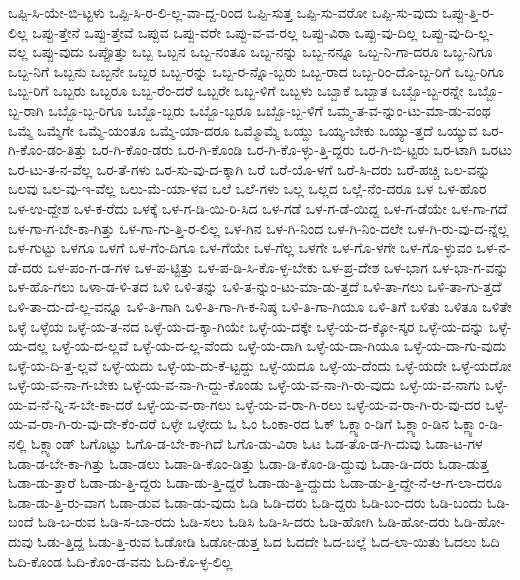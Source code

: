 {ಒಪ್ಪಿ-ಸಿ-ಯೇ-ಬಿ-ಟ್ಟಳು
ಒಪ್ಪಿ-ಸಿ-ರ-ಲಿ-ಲ್ಲ-ವಾ-ದ್ದ-ರಿಂದ
ಒಪ್ಪಿ-ಸುತ್ತ
ಒಪ್ಪಿ-ಸು-ವರೋ
ಒಪ್ಪಿ-ಸು-ವುದು
ಒಪ್ಪು-ತ್ತಿ-ರ-ಲಿಲ್ಲ
ಒಪ್ಪು-ತ್ತೇನೆ
ಒಪ್ಪು-ತ್ತೇವೆ
ಒಪ್ಪುವ
ಒಪ್ಪು-ವರೇ
ಒಪ್ಪು-ವ-ವ-ರಲ್ಲ
ಒಪ್ಪು-ವಿರಾ
ಒಪ್ಪು-ವು-ದಿಲ್ಲ
ಒಪ್ಪು-ವು-ದಿ-ಲ್ಲ-ವಲ್ಲ
ಒಪ್ಪು-ವುದು
ಒಪ್ಪೊತ್ತು
ಒಬ್ಬ
ಒಬ್ಬನ
ಒಬ್ಬ-ನಂತೂ
ಒಬ್ಬ-ನನ್ನು
ಒಬ್ಬ-ನನ್ನೂ
ಒಬ್ಬ-ನಿ-ಗಾ-ದರೂ
ಒಬ್ಬ-ನಿಗೂ
ಒಬ್ಬ-ನಿಗೆ
ಒಬ್ಬನು
ಒಬ್ಬನೇ
ಒಬ್ಬರ
ಒಬ್ಬ-ರನ್ನು
ಒಬ್ಬ-ರ-ನ್ನೊ-ಬ್ಬರು
ಒಬ್ಬ-ರಾದ
ಒಬ್ಬ-ರಿಂ-ದೊ-ಬ್ಬ-ರಿಗೆ
ಒಬ್ಬ-ರಿಗೂ
ಒಬ್ಬ-ರಿಗೆ
ಒಬ್ಬರು
ಒಬ್ಬರೂ
ಒಬ್ಬ-ರೆಂ-ದರೆ
ಒಬ್ಬರೇ
ಒಬ್ಬ-ಳಿಗೆ
ಒಬ್ಬಳು
ಒಬ್ಬಾಕೆ
ಒಬ್ಬಾತ
ಒಬ್ಬೊ-ಬ್ಬ-ರನ್ನೇ
ಒಬ್ಬೊ-ಬ್ಬ-ರಾಗಿ
ಒಬ್ಬೊ-ಬ್ಬ-ರಿಗೂ
ಒಬ್ಬೊ-ಬ್ಬರು
ಒಬ್ಬೊ-ಬ್ಬರೂ
ಒಬ್ಬೊ-ಬ್ಬ-ಳಿಗೆ
ಒಮ್ಮ-ತ-ವ-ನ್ನುಂ-ಟು-ಮಾ-ಡು-ವಂಥ
ಒಮ್ಮೆ
ಒಮ್ಮೆಗೇ
ಒಮ್ಮೆ-ಯಂತೂ
ಒಮ್ಮೆ-ಯಾ-ದರೂ
ಒಮ್ಮೊಮ್ಮೆ
ಒಯ್ದು
ಒಯ್ಯ-ಬೇಕು
ಒಯ್ಯು-ತ್ತದೆ
ಒಯ್ಯುವ
ಒರ-ಗಿ-ಕೊಂ-ಡಂ-ತಿತ್ತು
ಒರ-ಗಿ-ಕೊಂ-ಡರು
ಒರ-ಗಿ-ಕೊಂಡಿ
ಒರ-ಗಿ-ಕೊ-ಳ್ಳು-ತ್ತಿ-ದ್ದರು
ಒರ-ಗಿ-ಬಿ-ಟ್ಟರು
ಒರ-ಟಾಗಿ
ಒರಟು
ಒರ-ಟು-ತ-ನ-ವೆಲ್ಲ
ಒರ-ತೆ-ಗಳು
ಒರ-ಸು-ವು-ದ-ಕ್ಕಾಗಿ
ಒರೆ
ಒರೆ-ಯೊ-ಳಗೆ
ಒರೆ-ಸಿ-ದರು
ಒರೆ-ಹಚ್ಚಿ
ಒಲ-ವನ್ನು
ಒಲವು
ಒಲ-ವು-ಇ-ವೆಲ್ಲ
ಒಲು-ಮೆ-ಯಾ-ಳವ
ಒಲೆ
ಒಲೆ-ಗಳು
ಒಲ್ಲ
ಒಲ್ಲದ
ಒಲ್ಲೆ-ನೆಂ-ದರೂ
ಒಳ
ಒಳ-ಹೊರ
ಒಳ-ಉ-ದ್ದೇಶ
ಒಳ-ಕ-ರೆದು
ಒಳಕ್ಕೆ
ಒಳ-ಗ-ಡಿ-ಯಿ-ರಿ-ಸಿದ
ಒಳ-ಗಡೆ
ಒಳ-ಗ-ಡೆ-ಯಿದ್ದ
ಒಳ-ಗ-ಡೆಯೇ
ಒಳ-ಗಾ-ಗದೆ
ಒಳ-ಗಾ-ಗ-ಬೇ-ಕಾ-ಗಿತ್ತು
ಒಳ-ಗಾ-ಗು-ತ್ತಿ-ರ-ಲಿಲ್ಲ
ಒಳ-ಗಿನ
ಒಳ-ಗಿ-ನಿಂದ
ಒಳ-ಗಿ-ನಿಂ-ದಲೇ
ಒಳ-ಗಿ-ರು-ವು-ದ-ನ್ನೆಲ್ಲ
ಒಳ-ಗುಟ್ಟು
ಒಳಗೂ
ಒಳಗೆ
ಒಳ-ಗೆಂ-ದಿಗೂ
ಒಳ-ಗೆಯೇ
ಒಳ-ಗೆಲ್ಲ
ಒಳಗೇ
ಒಳ-ಗೊ-ಳಗೇ
ಒಳ-ಗೊ-ಳ್ಳುವಂ
ಒಳ-ನ-ಡೆ-ದರು
ಒಳ-ಪಂ-ಗ-ಡ-ಗಳ
ಒಳ-ಪ-ಟ್ಟಿತ್ತು
ಒಳ-ಪ-ಡಿ-ಸಿ-ಕೊ-ಳ್ಳ-ಬೇಕು
ಒಳ-ಪ್ರ-ದೇಶ
ಒಳ-ಭಾಗ
ಒಳ-ಭಾ-ಗ-ವನ್ನು
ಒಳ-ಹೊ-ಗಲು
ಒಳಾ-ಡ-ಳಿ-ತದ
ಒಳಿ
ಒಳಿ-ತನ್ನು
ಒಳಿ-ತ-ನ್ನುಂ-ಟು-ಮಾ-ಡು-ತ್ತದೆ
ಒಳಿ-ತಾ-ಗಲು
ಒಳಿ-ತಾ-ಗು-ತ್ತದೆ
ಒಳಿ-ತಾ-ದು-ದೆ-ಲ್ಲ-ವನ್ನೂ
ಒಳಿ-ತಿ-ಗಾಗಿ
ಒಳಿ-ತಿ-ಗಾ-ಗಿ-ಕ-ನಿಷ್ಠ
ಒಳಿ-ತಿ-ಗಾ-ಗಿಯೂ
ಒಳಿ-ತಿಗೆ
ಒಳಿತು
ಒಳಿತೂ
ಒಳಿತೇ
ಒಳ್ಳೆ
ಒಳ್ಳೆಯ
ಒಳ್ಳೆ-ಯ-ತ-ನದ
ಒಳ್ಳೆ-ಯ-ದ-ಕ್ಕಾ-ಗಿಯೇ
ಒಳ್ಳೆ-ಯ-ದಕ್ಕೇ
ಒಳ್ಳೆ-ಯ-ದ-ಕ್ಕೋ-ಸ್ಕರ
ಒಳ್ಳೆ-ಯ-ದನ್ನು
ಒಳ್ಳೆ-ಯ-ದಲ್ಲ
ಒಳ್ಳೆ-ಯ-ದ-ಲ್ಲವೆ
ಒಳ್ಳೆ-ಯ-ದ-ಲ್ಲ-ವೆಂದು
ಒಳ್ಳೆ-ಯ-ದಾಗಿ
ಒಳ್ಳೆ-ಯ-ದಾ-ಗಿಯೂ
ಒಳ್ಳೆ-ಯ-ದಾ-ಗು-ವುದು
ಒಳ್ಳೆ-ಯ-ದಿ-ತ್ತ-ಲ್ಲವೆ
ಒಳ್ಳೆ-ಯದು
ಒಳ್ಳೆ-ಯ-ದು-ಕೆ-ಟ್ಟದ್ದು
ಒಳ್ಳೆ-ಯದೂ
ಒಳ್ಳೆ-ಯ-ದೆಂದು
ಒಳ್ಳೆ-ಯದೇ
ಒಳ್ಳೆ-ಯದೋ
ಒಳ್ಳೆ-ಯ-ವ-ನಾ-ಗ-ಬೇಕು
ಒಳ್ಳೆ-ಯ-ವ-ನಾ-ಗಿ-ದ್ದು-ಕೊಂಡು
ಒಳ್ಳೆ-ಯ-ವ-ನಾ-ಗಿ-ರು-ವುದು
ಒಳ್ಳೆ-ಯ-ವ-ನಾಗು
ಒಳ್ಳೆ-ಯ-ವ-ನೆ-ನ್ನಿ-ಸ-ಬೇ-ಕಾ-ದರೆ
ಒಳ್ಳೆ-ಯ-ವ-ರಾ-ಗಲು
ಒಳ್ಳೆ-ಯ-ವ-ರಾ-ಗಿ-ರಲು
ಒಳ್ಳೆ-ಯ-ವ-ರಾ-ಗಿ-ರು-ವು-ದರ
ಒಳ್ಳೆ-ಯ-ವ-ರಾ-ಗಿ-ರು-ವು-ದೇ-ಕೆಂ-ದರೆ
ಒಳ್ಳೇ
ಒಳ್ಳೇದು
ಓ
ಓಂ
ಓಂಕಾ-ರದ
ಓಕ್
ಓಕ್ಲ್ಯಾಂ-ಡಿಗೆ
ಓಕ್ಲ್ಯಾಂ-ಡಿನ
ಓಕ್ಲ್ಯಾಂ-ಡಿ-ನಲ್ಲಿ
ಓಕ್ಲ್ಯಾಂಡ್
ಓಗೊಟ್ಟು
ಓಗೊ-ಡ-ಬೇ-ಕಾ-ಗಿದೆ
ಓಗೊ-ಡು-ವಿರಾ
ಓಟ
ಓಡ-ತೊ-ಡ-ಗಿ-ದುವು
ಓಡಾ-ಟ-ಗಳ
ಓಡಾ-ಡ-ಬೇ-ಕಾ-ಗಿತ್ತು
ಓಡಾ-ಡಲು
ಓಡಾ-ಡಿ-ಕೊಂ-ಡಿತ್ತು
ಓಡಾ-ಡಿ-ಕೊಂ-ಡಿ-ದ್ದುವು
ಓಡಾ-ಡಿ-ದರು
ಓಡಾ-ಡುತ್ತ
ಓಡಾ-ಡು-ತ್ತಾರೆ
ಓಡಾ-ಡು-ತ್ತಿ-ದ್ದರು
ಓಡಾ-ಡು-ತ್ತಿ-ದ್ದರೆ
ಓಡಾ-ಡು-ತ್ತಿ-ದ್ದುದು
ಓಡಾ-ಡು-ತ್ತಿ-ದ್ದೇ-ನೆ-ಆ-ಗ-ಲಾ-ದರೂ
ಓಡಾ-ಡು-ತ್ತಿ-ರು-ವಾಗ
ಓಡಾ-ಡುವ
ಓಡಾ-ಡು-ವುದು
ಓಡಿ
ಓಡಿ-ದರು
ಓಡಿ-ದ್ದರು
ಓಡಿ-ಬಂ-ದರು
ಓಡಿ-ಬಂದು
ಓಡಿ-ಬಂದೆ
ಓಡಿ-ಬ-ರುವ
ಓಡಿ-ಸ-ಬಾ-ರದು
ಓಡಿ-ಸಲು
ಓಡಿಸಿ
ಓಡಿ-ಸಿ-ದರು
ಓಡಿ-ಹೋಗಿ
ಓಡಿ-ಹೋ-ದರು
ಓಡಿ-ಹೋ-ದುವು
ಓಡು-ತ್ತಿದ್ದ
ಓಡು-ತ್ತಿ-ರುವ
ಓಡೋಡಿ
ಓಡೋ-ಡುತ್ತ
ಓದ
ಓದದೇ
ಓದ-ಬಲ್ಲೆ
ಓದ-ಲಾ-ಯಿತು
ಓದಲು
ಓದಿ
ಓದಿ-ಕೊಂಡ
ಓದಿ-ಕೊಂ-ಡ-ವನು
ಓದಿ-ಕೊ-ಳ್ಳ-ಲಿಲ್ಲ
}
